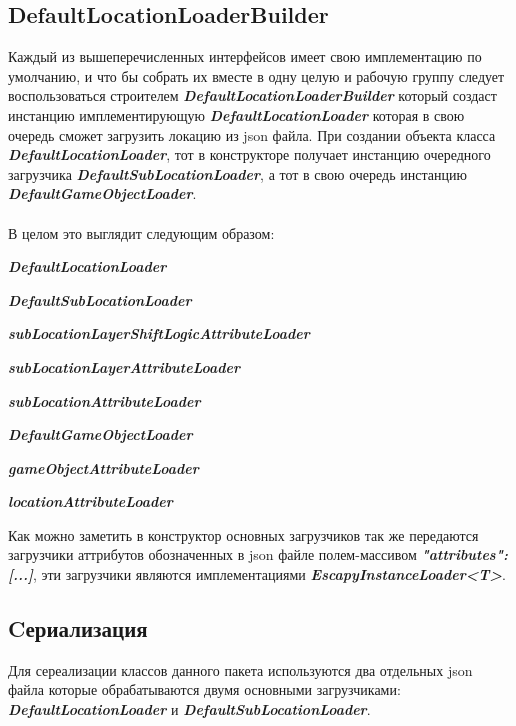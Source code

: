 \documentclass[11pt]{report}
\newenvironment{itemize*}%
  {\begin{itemize}%
    \setlength{\itemsep}{2pt}%
    \setlength{\parskip}{0.75pt}}%
  {\end{itemize}}
\begin{document}
\subsection{DefaultLocationLoaderBuilder}
Каждый из вышеперечисленных интерфейсов имеет свою имплементацию по умолчанию, и что бы собрать их вместе в одну целую и рабочую группу следует воспользоваться строителем 
\textit{\textbf{DefaultLocationLoaderBuilder}} который создаст инстанцию имплементирующую 
\textit{\textbf{DefaultLocationLoader}} которая в свою очередь сможет загрузить локацию из json файла. При создании объекта класса \textit{\textbf{DefaultLocationLoader}}, тот в конструкторе получает инстанцию очередного загрузчика \textit{\textbf{DefaultSubLocationLoader}}, а тот в свою очередь 
инстанцию \textit{\textbf{DefaultGameObjectLoader}}. \\\\
В целом это выглядит следующим образом: 
\begin{itemize*}
	\item \textit{\textbf{DefaultLocationLoader}}
	\begin{itemize*}
		
		\item \textit{\textbf{DefaultSubLocationLoader}}
		\begin{itemize*}
			\item \textit{\textbf{subLocationLayerShiftLogicAttributeLoader}}
			\item \textit{\textbf{subLocationLayerAttributeLoader}}
			\item \textit{\textbf{subLocationAttributeLoader}}
			\item \textit{\textbf{DefaultGameObjectLoader}}
			\begin{itemize*}
				\item \textit{\textbf{gameObjectAttributeLoader}}
			\end{itemize*}
		\end{itemize*}
		\item \textit{\textbf{locationAttributeLoader}}
	\end{itemize*}
\end{itemize*}
Как можно заметить в конструктор основных загрузчиков так же передаются загрузчики аттрибутов обозначенных в json файле полем-массивом \textit{\textbf{"attributes": [...]}}, эти загрузчики являются имплементациями \textit{\textbf{EscapyInstanceLoader<T>}}.\\

\subsection{Cериализация}
Для сереализации классов данного пакета используются два отдельных json файла которые обрабатываются двумя основными загрузчиками:\\ \textit{\textbf{DefaultLocationLoader}} и
\textit{\textbf{DefaultSubLocationLoader}}.
\end{document}
